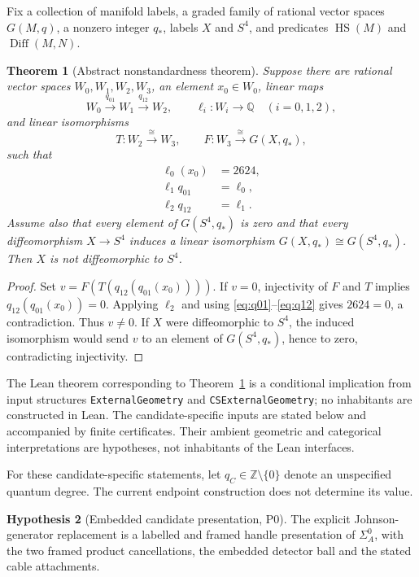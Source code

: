 \documentclass[11pt]{amsart}
\newtheorem{theorem}{Theorem}[section]
\theoremstyle{definition}
\newtheorem{hypothesis}[theorem]{Hypothesis}
\theoremstyle{remark}
\newcommand{\Q}{\mathbb{Q}}
\begin{document}
Fix a collection of manifold labels, a graded family of rational vector
spaces $G(M,q)$, a nonzero integer $q_*$, labels $X$ and $S^4$, and predicates
\(\operatorname{HS}(M)\) and \(\operatorname{Diff}(M,N)\).

\begin{theorem}[Abstract nonstandardness theorem]\label{thm:A}
Suppose there are rational vector spaces $W_0,W_1,W_2,W_3$, an element
$x_0\in W_0$, linear maps
\[
W_0\xrightarrow{q_{01}}W_1\xrightarrow{q_{12}}W_2,
\qquad
\ell_i:W_i\longrightarrow\Q\quad (i=0,1,2),
\]
and linear isomorphisms
\[
T:W_2\xrightarrow{\cong}W_3,
\qquad
F:W_3\xrightarrow{\cong}G(X,q_*),
\]
such that
\begin{align}
\ell_0(x_0)&=2624,\label{eq:value}\\
\ell_1q_{01}&=\ell_0,\label{eq:q01}\\
\ell_2q_{12}&=\ell_1.\label{eq:q12}
\end{align}
Assume also that every element of $G(S^4,q_*)$ is zero and that every
diffeomorphism $X\to S^4$ induces a linear isomorphism
\(G(X,q_*)\cong G(S^4,q_*)\).  Then $X$ is not diffeomorphic to $S^4$.
\end{theorem}

\begin{proof}
Set $v=F(T(q_{12}(q_{01}(x_0))))$.  If $v=0$, injectivity of $F$ and $T$
implies $q_{12}(q_{01}(x_0))=0$.  Applying $\ell_2$ and using
\eqref{eq:q01}--\eqref{eq:q12} gives $2624=0$, a contradiction.  Thus
$v\ne0$.  If $X$ were diffeomorphic to $S^4$, the induced isomorphism would
send $v$ to an element of $G(S^4,q_*)$, hence to zero, contradicting
injectivity.
\end{proof}

The Lean theorem corresponding to Theorem~\ref{thm:A} is a conditional
implication from input structures \texttt{ExternalGeometry} and
\texttt{CSExternalGeometry}; no inhabitants are constructed in Lean.
The candidate-specific inputs are stated below and accompanied by finite
certificates.  Their ambient geometric and categorical interpretations are
hypotheses, not inhabitants of the Lean interfaces.

For these candidate-specific statements, let
$q_C\in\mathbb Z\setminus\{0\}$ denote an unspecified quantum degree.  The
current endpoint construction does not determine its value.

\begin{hypothesis}[Embedded candidate presentation, P0]\label{hyp:P0}
The explicit Johnson-generator replacement is a labelled and framed handle
presentation of $\Sigma_A^0$, with the two framed product cancellations, the
embedded detector ball and the stated cable attachments.
\end{hypothesis}
\end{document}
